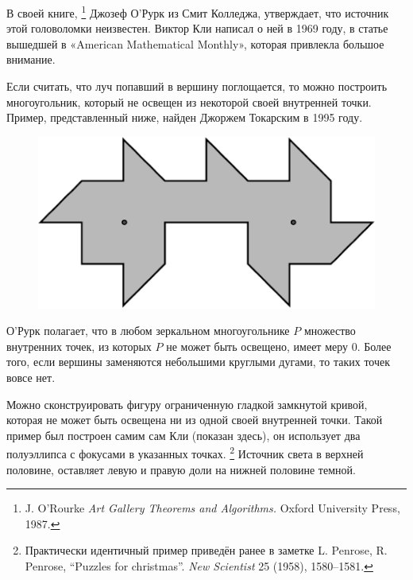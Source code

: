 В своей книге,%
\footnote{J. O'Rourke \emph{Art Gallery Theorems and Algorithms.} Oxford University Press, 1987.}
Джозеф О’Рурк %
из Смит Колледжа, утверждает, что источник этой головоломки неизвестен.
Виктор Кли написал о ней в 1969 году, в статье вышедшей в «American Mathematical Monthly», которая привлекла большое внимание. 

Если считать, что луч попавший в вершину поглощается, то можно построить многоугольник, который не освещен из некоторой своей внутренней точки.
Пример, представленный ниже, найден Джоржем Токарским в 1995 году.

\begin{figure}[h!]
\centering
\includegraphics[scale=0.5]{Figs/UnsolvedPuzzles/vision}
\end{figure} 

О’Рурк полагает, что в любом зеркальном многоугольнике $P$ множество внутренних точек, из которых $P$ не может быть освещено, имеет меру 0.
Более того, если вершины заменяются небольшими круглыми дугами, то таких точек вовсе нет.

Можно сконструировать фигуру ограниченную гладкой замкнутой кривой, которая не может быть освещена ни из одной своей внутренней точки. 
Такой пример был построен самим сам Кли (показан здесь), он использует два полуэллипса с фокусами в указанных точках.%
\footnote{Практически идентичный пример приведён ранее в заметке L. Penrose, R. Penrose, ``Puzzles for christmas''. \emph{New Scientist} 25 (1958), 1580--1581.}
Источник света в верхней половине, оставляет левую и правую доли на нижней половине темной.

